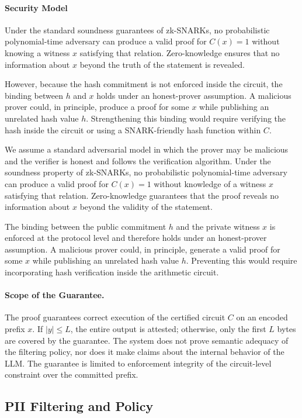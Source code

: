 \documentclass[10pt,conference,a4paper]{IEEEtran}
\begin{document}
\paragraph{Security Model}
Under the standard soundness guarantees of zk-SNARKs, no probabilistic polynomial-time adversary can produce a valid proof for $C(x)=1$ without knowing a witness $x$ satisfying that relation. Zero-knowledge ensures that no information about $x$ beyond the truth of the statement is revealed.

However, because the hash commitment is not enforced inside the circuit, the binding between $h$ and $x$ holds under an honest-prover assumption. A malicious prover could, in principle, produce a proof for some $x$ while publishing an unrelated hash value $h$. Strengthening this binding would require verifying the hash inside the circuit or using a SNARK-friendly hash function within $C$.

We assume a standard adversarial model in which the prover may be malicious and the verifier is honest and follows the verification algorithm. Under the soundness property of zk-SNARKs, no probabilistic polynomial-time adversary can produce a valid proof for $C(x)=1$ without knowledge of a witness $x$ satisfying that relation. Zero-knowledge guarantees that the proof reveals no information about $x$ beyond the validity of the statement.

The binding between the public commitment $h$ and the private witness $x$ is enforced at the protocol level and therefore holds under an honest-prover assumption. A malicious prover could, in principle, generate a valid proof for some $x$ while publishing an unrelated hash value $h$. Preventing this would require incorporating hash verification inside the arithmetic circuit.

\paragraph{Scope of the Guarantee.}
The proof guarantees correct execution of the certified circuit $C$ on an encoded prefix $x$. If $|y| \le L$, the entire output is attested; otherwise, only the first $L$ bytes are covered by the guarantee. The system does not prove semantic adequacy of the filtering policy, nor does it make claims about the internal behavior of the LLM. The guarantee is limited to enforcement integrity of the circuit-level constraint over the committed prefix.

\subsection{PII Filtering and Policy}
\end{document}
